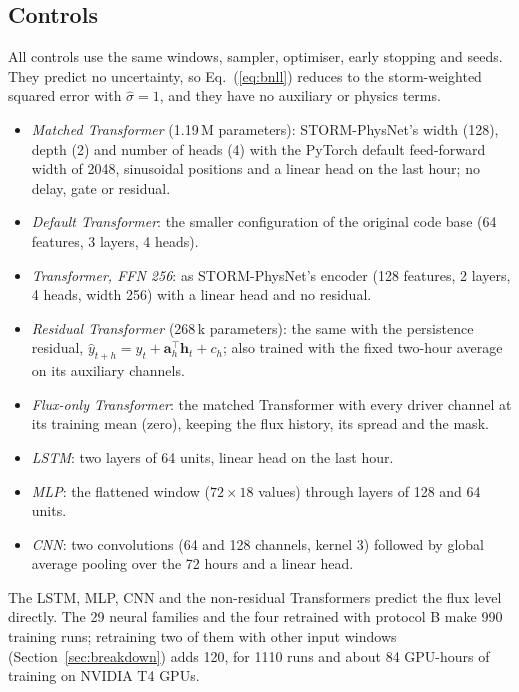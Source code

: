\documentclass[a4paper,fleqn]{cas-dc}
\begin{document}
\subsection{Controls}
\label{sec:controls}
All controls use the same windows, sampler, optimiser, early stopping and seeds. They predict no uncertainty, so
Eq.~(\ref{eq:bnll}) reduces to the storm-weighted squared error with \(\hat\sigma=1\), and they have no auxiliary or
physics terms.
\begin{itemize}
\item \emph{Matched Transformer} (1.19\,M parameters): STORM-PhysNet's width (128), depth (2) and number of heads
(4) with the PyTorch default feed-forward width of 2048, sinusoidal positions and a linear head on the last hour;
no delay, gate or residual.
\item \emph{Default Transformer}: the smaller configuration of the original code base (64 features, 3 layers, 4 heads).
\item \emph{Transformer, FFN 256}: as STORM-PhysNet's encoder (128 features, 2 layers, 4 heads, width 256) with a
linear head and no residual.
\item \emph{Residual Transformer} (268\,k parameters): the same with the persistence residual,
\(\hat y_{t+h}=y_t+\mathbf a_h^\top\mathbf h_t+c_h\); also trained with the fixed two-hour average on its auxiliary
channels.
\item \emph{Flux-only Transformer}: the matched Transformer with every driver channel at its training mean (zero),
keeping the flux history, its spread and the mask.
\item \emph{LSTM}: two layers of 64 units, linear head on the last hour.
\item \emph{MLP}: the flattened window (\(72\times18\) values) through layers of 128 and 64 units.
\item \emph{CNN}: two convolutions (64 and 128 channels, kernel 3) followed by global average pooling over the 72
hours and a linear head.
\end{itemize}
The LSTM, MLP, CNN and the non-residual Transformers predict the flux level directly. The 29 neural families
and the four retrained with protocol B make 990 training runs; retraining two of them with other input windows
(Section~\ref{sec:breakdown}) adds 120, for 1110 runs and about 84 GPU-hours of training on NVIDIA T4 GPUs.
\end{document}
